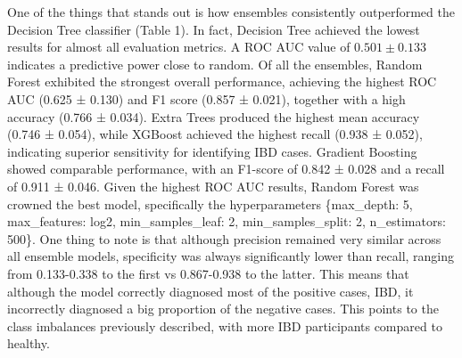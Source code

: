 \documentclass[twoside,twocolumn,10pt]{article}
\begin{document}
One of the things that stands out is how ensembles consistently outperformed the Decision Tree classifier (Table 1). In fact, Decision Tree achieved the lowest results for almost all evaluation metrics. A ROC AUC value of \(0.501 \pm 0.133\) indicates a predictive power close to random. Of all the ensembles, Random Forest exhibited the strongest overall performance, achieving the highest ROC AUC (0.625 ± 0.130) and F1 score (0.857 ± 0.021), together with a high accuracy (0.766 ± 0.034). Extra Trees produced the highest mean accuracy (0.746 ± 0.054), while XGBoost achieved the highest recall (0.938 ± 0.052), indicating superior sensitivity for identifying IBD cases. Gradient Boosting showed comparable performance, with an F1-score of 0.842 ± 0.028 and a recall of 0.911 ± 0.046. Given the highest ROC AUC results, Random Forest was crowned the best model, specifically the hyperparameters \{max\_depth: 5, max\_features: log2, min\_samples\_leaf: 2, min\_samples\_split: 2, n\_estimators: 500\}.
One thing to note is that although precision remained very similar across all ensemble models, specificity was always significantly lower than recall, ranging from 0.133-0.338 to the first vs 0.867-0.938 to the latter. This means that although the model correctly diagnosed most of the positive cases, IBD, it incorrectly diagnosed a big proportion of the negative cases. This points to the class imbalances previously described, with more IBD participants compared to healthy.
\end{document}
